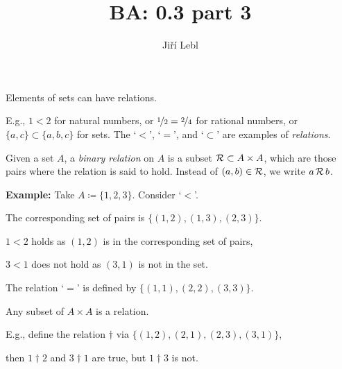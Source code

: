 \documentclass[10pt,aspectratio=149]{beamer}
\author{Ji\v{r}\'i Lebl}
\institute[OSU]{%
Departemento pri Matematiko de Oklahoma {\^S}tata Universitato}
\title{BA: 0.3 part 3}
\date{}
\begin{document}
\begin{frame}
\titlepage
\end{frame}

\begin{frame}
Elements of sets can have relations.

E.g., $1 < 2$
for natural numbers, or $\nicefrac{1}{2} = \nicefrac{2}{4}$ for rational
numbers, or $\{ a,c \} \subset \{ a,b,c \}$ for sets.  The `$<$', `$=$', and
`$\subset$' are examples of \emph{relations}.

\pause

\begin{definition}
Given a set $A$, a \emph{binary relation} on $A$
is a subset ${\mathcal{R}} \subset A \times A$,
which are those pairs where the relation is said to hold.
Instead of $(a,b) \in {\mathcal{R}}$, we write
$a \, {\mathcal{R}} \, b$.
\end{definition}

\pause
\textbf{Example:}
Take $A \coloneqq \{ 1,2,3 \}$.
Consider `$<$'.

\pause
\medskip

The corresponding set 
of pairs is $\bigl\{ (1,2), (1,3), (2,3) \bigr\}$.

\pause
\medskip

$1 < 2$ holds as $(1,2)$ is in the corresponding set of pairs,
\pause

$3 < 1$ does not hold as $(3,1)$ is not in the set.

\medskip
\pause

The relation `$=$'
is defined by $\bigl\{ (1,1), (2,2), (3,3) \big\}$.

\medskip
\pause

Any subset of $A \times A$ is a relation.
\pause

E.g., define the relation
$\dagger$ via $\bigl\{ (1,2), (2,1), (2,3), (3,1) \bigr\}$,

\pause
then $1 \dagger 2$ and
$3 \dagger 1$ are
true, but $1 \dagger 3$ is not.
\end{frame}
\end{document}
